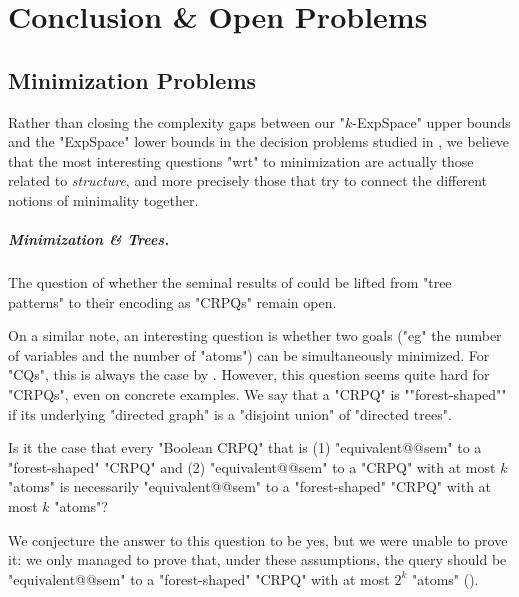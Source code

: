 \chapter[Conclusion \&~Open Problems]{Conclusion \& Open Problems}
\label{ch:conclu-database}
\renewcommand\thefigure{\thechapter.\arabic{figure}}

\begin{chapterpresentation}
	\begin{abstract}
		\todo{}
	\end{abstract}
		
	\par\bigskip\bigskip
	\chaptertoc
\end{chapterpresentation}

\section{Minimization Problems}

Rather than closing the complexity gaps between our "$k$-ExpSpace" upper bounds
and the "ExpSpace" lower bounds in the decision problems
studied in ,
we believe that the most interesting questions "wrt" to minimization
are actually those related to \emph{structure}, and more precisely those that try to
connect the different notions of minimality together.

\conjAtomVariableMinimal*

\paragraph*{Minimization \& Trees.}
The question of whether the seminal results of \cite{CzerwinskiMartensNiewerthParys2018Minimization} could be lifted from "tree patterns"
to their encoding as "CRPQs" remain open.
\conjTreePatternsAsCRPQs*

On a similar note, an interesting question is whether two goals
("eg" the number of variables and the number of "atoms")
can be simultaneously minimized.
For "CQs", this is always the case by . However, this question
seems quite hard for "CRPQs", even on concrete examples.
We say that a "CRPQ" is ""forest-shaped"" if its underlying "directed graph"
is a "disjoint union" of "directed trees".
\begin{question}
	Is it the case that every "Boolean CRPQ" that is (1) "equivalent@@sem" to
	a "forest-shaped" "CRPQ" and (2) "equivalent@@sem" to a "CRPQ"
  with at most $k$ "atoms" is necessarily "equivalent@@sem" to a 
  "forest-shaped" "CRPQ" with at most $k$ "atoms"?
\end{question}
We conjecture the answer to this question to be yes, but we were unable to prove it:
we only managed to prove that, under these assumptions, the query
should be "equivalent@@sem" to a "forest-shaped" "CRPQ" with at most $2^k$ "atoms"
().



